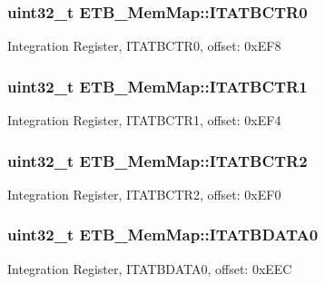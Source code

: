 \subsubsection[{I\+T\+A\+T\+B\+C\+T\+R0}]{\setlength{\rightskip}{0pt plus 5cm}uint32\+\_\+t E\+T\+B\+\_\+\+Mem\+Map\+::\+I\+T\+A\+T\+B\+C\+T\+R0}\label{struct_e_t_b___mem_map_a9da4a06848bfc47161b31c234eaaeb81}
Integration Register, I\+T\+A\+T\+B\+C\+T\+R0, offset\+: 0x\+E\+F8 \hypertarget{struct_e_t_b___mem_map_af2f4b9c2591e22c26c35cf21bf023f32}{}
\subsubsection[{I\+T\+A\+T\+B\+C\+T\+R1}]{\setlength{\rightskip}{0pt plus 5cm}uint32\+\_\+t E\+T\+B\+\_\+\+Mem\+Map\+::\+I\+T\+A\+T\+B\+C\+T\+R1}\label{struct_e_t_b___mem_map_af2f4b9c2591e22c26c35cf21bf023f32}
Integration Register, I\+T\+A\+T\+B\+C\+T\+R1, offset\+: 0x\+E\+F4 \hypertarget{struct_e_t_b___mem_map_a1c0bbc031154c0fb2c335b4cffadb9e5}{}
\subsubsection[{I\+T\+A\+T\+B\+C\+T\+R2}]{\setlength{\rightskip}{0pt plus 5cm}uint32\+\_\+t E\+T\+B\+\_\+\+Mem\+Map\+::\+I\+T\+A\+T\+B\+C\+T\+R2}\label{struct_e_t_b___mem_map_a1c0bbc031154c0fb2c335b4cffadb9e5}
Integration Register, I\+T\+A\+T\+B\+C\+T\+R2, offset\+: 0x\+E\+F0 \hypertarget{struct_e_t_b___mem_map_a7dfaed9b0dca763ce269813543c7bf83}{}
\subsubsection[{I\+T\+A\+T\+B\+D\+A\+T\+A0}]{\setlength{\rightskip}{0pt plus 5cm}uint32\+\_\+t E\+T\+B\+\_\+\+Mem\+Map\+::\+I\+T\+A\+T\+B\+D\+A\+T\+A0}\label{struct_e_t_b___mem_map_a7dfaed9b0dca763ce269813543c7bf83}
Integration Register, I\+T\+A\+T\+B\+D\+A\+T\+A0, offset\+: 0x\+E\+E\+C \hypertarget{struct_e_t_b___mem_map_acf9a92d3db15cc318551da316524d21b}{}
